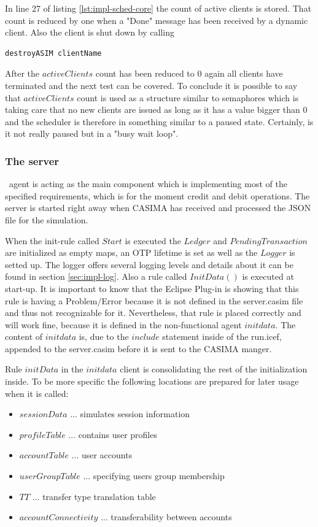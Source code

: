 In line 27 of listing \ref{lst:impl-sched-core} the count of active clients is stored. That count is reduced by one when a "Done" message has been received by a dynamic client. Also the client is shut down by calling

\begin{lstlisting}[language=bsl]
	destroyASIM clientName
\end{lstlisting}

After the $activeClients$ count has been reduced to $0$ again all clients have terminated and the next test can be covered. To conclude it is possible to say that $activeClients$ count is used as a structure similar to semaphores which is taking care that no new clients are issued as long as it has a value bigger than $0$ and the scheduler is therefore in something similar to a paused state. Certainly, is it not really paused but in a "busy wait loop".

\subsubsection{The server}\ agent is acting as the main component which is implementing most of the specified requirements, which is for the moment credit and debit operations. The server is started right away when CASIMA has received and processed the JSON file for the simulation.

When the init-rule called $Start$ is executed the $Ledger$ and $PendingTransaction$ are initialized as empty maps, an OTP lifetime is set as well as the $Logger$ is setted up. The logger offers several logging levels and details about it can be found in section \ref{sec:impl-log}. Also a rule called $InitData()$ is executed at start-up. It is important to know that the Eclipse Plug-in is showing that this rule is having a Problem/Error because it is not defined in the server.casim file and thus not recognizable for it. Nevertheless, that rule is placed correctly and will work fine, because it is defined in the non-functional agent $initdata$. The content of $initdata$ is, due to the $include$ statement inside of the run.icef, appended to the server.casim before it is sent to the CASIMA manger.

Rule $initData$ in the $initdata$ client is consolidating the rest of the initialization inside. To be more specific the following locations are prepared for later usage when it is called:

\begin{itemize}
	\item $sessionData$ ... simulates session information
	\item $profileTable$ ... contains user profiles
	\item $accountTable$ ... user accounts
	\item $userGroupTable$ ... specifying users group membership
	\item $TT$ ... transfer type translation table
	\item $accountConnectivity$ ... transferability between accounts
\end{itemize}

